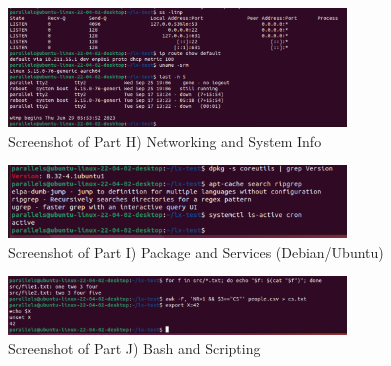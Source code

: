 \begin{figure}[h!]
    \centering
    \includegraphics[width=0.8\textwidth]{linuxptH.png}
    \caption{Screenshot of Part H) Networking and System Info}
    \label{fig:problemsetH}
    
\end{figure}

\begin{figure}[h!]
    \centering
    \includegraphics[width=0.8\textwidth]{linuxptI.png}
    \caption{Screenshot of Part I) Package and Services (Debian/Ubuntu)}
    \label{fig:problemsetI}
    
\end{figure}

\begin{figure}[h!]
    \centering
    \includegraphics[width=0.8\textwidth]{linuxptJ.png}
    \caption{Screenshot of Part J) Bash and Scripting}
    \label{fig:problemsetJ}
    
\end{figure}